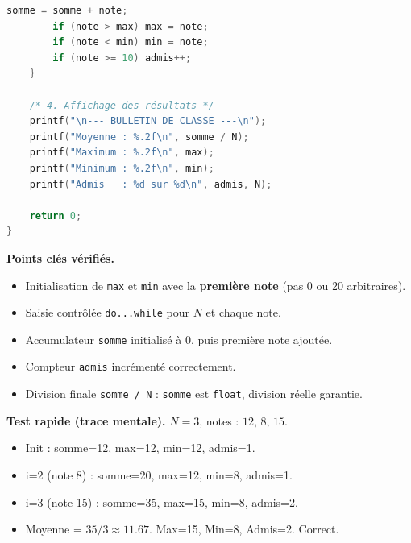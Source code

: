\documentclass[11pt]{article}
\begin{document}
\begin{exoresolu}
\begin{lstlisting}[language=C]
        somme = somme + note;
        if (note > max) max = note;
        if (note < min) min = note;
        if (note >= 10) admis++;
    }

    /* 4. Affichage des résultats */
    printf("\n--- BULLETIN DE CLASSE ---\n");
    printf("Moyenne : %.2f\n", somme / N);
    printf("Maximum : %.2f\n", max);
    printf("Minimum : %.2f\n", min);
    printf("Admis   : %d sur %d\n", admis, N);

    return 0;
}
\end{lstlisting}

\textbf{Points clés vérifiés.}
\begin{itemize}
\item Initialisation de \texttt{max} et \texttt{min} avec la \textbf{première note} (pas 0 ou 20 arbitraires).
\item Saisie contrôlée \texttt{do...while} pour $N$ et chaque note.
\item Accumulateur \texttt{somme} initialisé à 0, puis première note ajoutée.
\item Compteur \texttt{admis} incrémenté correctement.
\item Division finale \texttt{somme / N} : \texttt{somme} est \texttt{float}, division réelle garantie.
\end{itemize}

\textbf{Test rapide (trace mentale).} $N=3$, notes : $12$, $8$, $15$.
\begin{itemize}
\item Init : somme=12, max=12, min=12, admis=1.
\item i=2 (note 8) : somme=20, max=12, min=8, admis=1.
\item i=3 (note 15) : somme=35, max=15, min=8, admis=2.
\item Moyenne = $35/3 \approx 11.67$. Max=15, Min=8, Admis=2. Correct.
\end{itemize}
\end{exoresolu}
\end{document}
